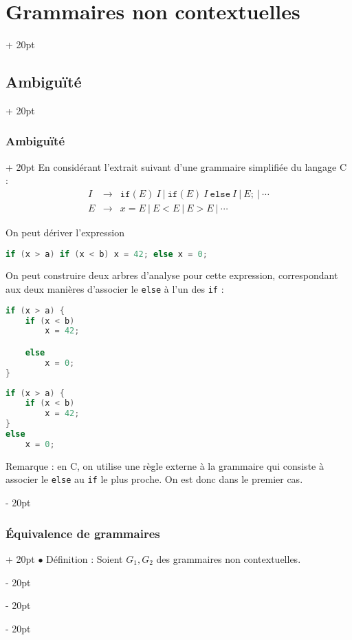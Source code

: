 \documentclass[a4paper, 12pt, twoside]{article}
\newcommand{\ind}[1][20pt]{\advance\leftskip + #1}
\newcommand{\deind}[1][20pt]{\advance\leftskip - #1}
\newenvironment{indt}[2][20pt]{#2 \par \ind[#1]}{\par \deind} %
\begin{document}
\begin{indt}{\section{Grammaires non contextuelles}}
\begin{indt}{\subsection{Ambiguïté}}
\begin{indt}{\subsubsection{Ambiguïté}}
                En considérant l'extrait suivant d'une grammaire simplifiée du langage C :
                \[
                    \begin{array}{rcl}
                        I & \rightarrow & \mathtt{if} (E)\ I \ |\ \mathtt{if} (E)\ I\ \mathtt{else}\ I \ |\ E ; \ |\ \cdots
                        \\
                        E & \rightarrow & x = E \ |\ E < E \ |\ E > E \ |\ \cdots
                    \end{array}
                \]

                On peut dériver l'expression
                \begin{lstlisting}[language=C, xleftmargin=80pt]
if (x > a) if (x < b) x = 42; else x = 0;\end{lstlisting}

                On peut construire deux arbres d'analyse pour cette expression, correspondant aux deux manières d'associer le \texttt{else} à l'un des \texttt{if} :

                \begin{lstlisting}[language=C, xleftmargin=80pt]
if (x > a) {
    if (x < b)
        x = 42;

    else
        x = 0;
}\end{lstlisting}

                \begin{lstlisting}[language=C, xleftmargin=80pt]
if (x > a) {
    if (x < b)
        x = 42;
}
else
    x = 0;\end{lstlisting}

                \vspace{12pt}
                
                Remarque : en C, on utilise une règle externe à la grammaire qui consiste à associer le \texttt{else} au \texttt{if} le plus proche. On est donc dans le premier cas.
            \end{indt}

            \vspace{12pt}
            
            \begin{indt}{\subsubsection{\'Equivalence de grammaires}}
                $\bullet$ Définition : Soient $G_1, G_2$ des grammaires non contextuelles.


\end{indt}
\end{indt}
\end{indt}
\end{document}
